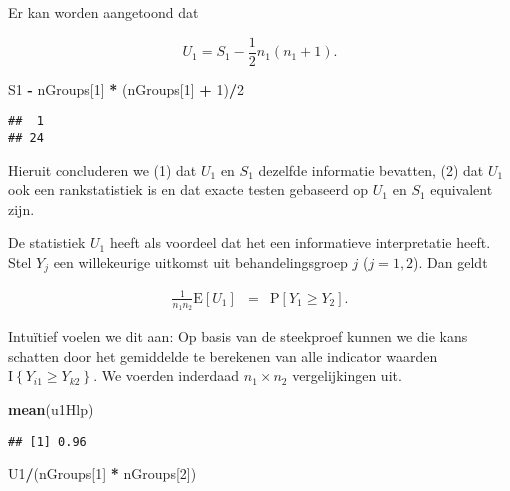 \documentclass[12pt,dutch,coursenotes]{book}
\newenvironment{Shaded}{\begin{snugshade}}{\end{snugshade}}
\newcommand{\KeywordTok}[1]{\textcolor[rgb]{0.13,0.29,0.53}{\textbf{#1}}}
\newcommand{\DecValTok}[1]{\textcolor[rgb]{0.00,0.00,0.81}{#1}}
\newcommand{\StringTok}[1]{\textcolor[rgb]{0.31,0.60,0.02}{#1}}
\newcommand{\OperatorTok}[1]{\textcolor[rgb]{0.81,0.36,0.00}{\textbf{#1}}}
\newcommand{\NormalTok}[1]{#1}
\theoremstyle{definition}
\theoremstyle{definition}
\theoremstyle{definition}
\theoremstyle{remark}
\begin{document}
Er kan worden aangetoond dat

\[U_1 = S_1 - \frac{1}{2}n_1(n_1+1).\]

\begin{Shaded}
\begin{Highlighting}[]
\NormalTok{S1 }\OperatorTok{-}\StringTok{ }\NormalTok{nGroups[}\DecValTok{1}\NormalTok{] }\OperatorTok{*}\StringTok{ }\NormalTok{(nGroups[}\DecValTok{1}\NormalTok{] }\OperatorTok{+}\StringTok{ }\DecValTok{1}\NormalTok{)}\OperatorTok{/}\DecValTok{2}
\end{Highlighting}
\end{Shaded}

\begin{verbatim}
##  1 
## 24
\end{verbatim}

Hieruit concluderen we (1) dat \(U_1\) en \(S_1\) dezelfde informatie
bevatten, (2) dat \(U_1\) ook een rankstatistiek is en dat exacte testen
gebaseerd op \(U_1\) en \(S_1\) equivalent zijn.

De statistiek \(U_1\) heeft als voordeel dat het een informatieve
interpretatie heeft. Stel \(Y_j\) een willekeurige uitkomst uit
behandelingsgroep \(j\) (\(j=1,2\)). Dan geldt

\begin{eqnarray*}
  \frac{1}{n_1n_2}\text{E}\left[U_1\right] 
     &=& \text{P}\left[Y_1 \geq Y_2\right].
\end{eqnarray*}

Intuïtief voelen we dit aan: Op basis van de steekproef kunnen we die
kans schatten door het gemiddelde te berekenen van alle indicator
waarden \(\text{I}\left\{Y_{i1}\geq Y_{k2}\right\}\). We voerden
inderdaad \(n_1 \times n_2\) vergelijkingen uit.

\begin{Shaded}
\begin{Highlighting}[]
\KeywordTok{mean}\NormalTok{(u1Hlp)}
\end{Highlighting}
\end{Shaded}

\begin{verbatim}
## [1] 0.96
\end{verbatim}

\begin{Shaded}
\begin{Highlighting}[]
\NormalTok{U1}\OperatorTok{/}\NormalTok{(nGroups[}\DecValTok{1}\NormalTok{] }\OperatorTok{*}\StringTok{ }\NormalTok{nGroups[}\DecValTok{2}\NormalTok{])}
\end{Highlighting}
\end{Shaded}
\end{document}

